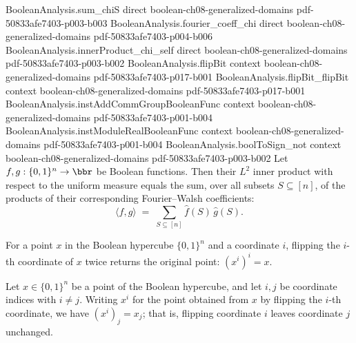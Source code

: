 \begin{theorem}
\proofstep
  {BooleanAnalysis.sum_chiS}
  {direct}
  {boolean-ch08-generalized-domains}
  {pdf-50833afe7403-p003-b003}
\proofstep
  {BooleanAnalysis.fourier_coeff_chi}
  {direct}
  {boolean-ch08-generalized-domains}
  {pdf-50833afe7403-p004-b006}
\proofstep
  {BooleanAnalysis.innerProduct_chi_self}
  {direct}
  {boolean-ch08-generalized-domains}
  {pdf-50833afe7403-p003-b002}
\proofstep
  {BooleanAnalysis.flipBit}
  {context}
  {boolean-ch08-generalized-domains}
  {pdf-50833afe7403-p017-b001}
\proofstep
  {BooleanAnalysis.flipBit_flipBit}
  {context}
  {boolean-ch08-generalized-domains}
  {pdf-50833afe7403-p017-b001}
\proofstep
  {BooleanAnalysis.instAddCommGroupBooleanFunc}
  {context}
  {boolean-ch08-generalized-domains}
  {pdf-50833afe7403-p001-b004}
\proofstep
  {BooleanAnalysis.instModuleRealBooleanFunc}
  {context}
  {boolean-ch08-generalized-domains}
  {pdf-50833afe7403-p001-b004}
\proofstep
  {BooleanAnalysis.boolToSign_not}
  {context}
  {boolean-ch08-generalized-domains}
  {pdf-50833afe7403-p003-b002}
Let $f, g : \{0,1\}^n \to \bbr$ be Boolean functions. Then their $L^2$ inner product
with respect to the uniform measure equals the sum, over all subsets $S \subseteq [n]$,
of the products of their corresponding Fourier--Walsh coefficients:
\[
  \langle f, g\rangle \;=\; \sum_{S\subseteq[n]} \hat f(S)\,\hat g(S).
\]
\end{theorem}

\begin{lemma}
\label{BooleanAnalysis.flipBit_flipBit}
\leanok
{}
For a point $x$ in the Boolean hypercube $\{0,1\}^n$ and a coordinate $i$, flipping the
$i$-th coordinate of $x$ twice returns the original point: $(x^i)^i = x$.
\end{lemma}

\begin{lemma}
\label{BooleanAnalysis.flipBit_ne}
\leanok
{}
Let $x\in\{0,1\}^n$ be a point of the Boolean hypercube, and let $i,j$ be coordinate
indices with $i\ne j$. Writing $x^i$ for the point obtained from $x$ by flipping the
$i$-th coordinate, we have $(x^i)_j = x_j$; that is, flipping coordinate $i$ leaves
coordinate $j$ unchanged.
\end{lemma}

